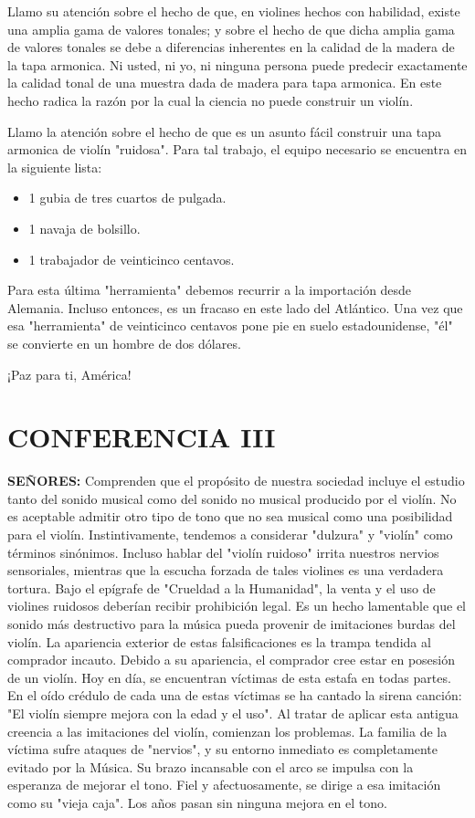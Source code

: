 \documentclass[12pt]{book}
\begin{document}
Llamo su atención sobre el hecho de que, en violines hechos con habilidad, existe una amplia gama de valores tonales; y sobre el hecho de que dicha amplia gama de valores tonales se debe a diferencias inherentes en la calidad de la madera de la tapa armonica. Ni usted, ni yo, ni ninguna persona puede predecir exactamente la calidad tonal de una muestra dada de madera para tapa armonica. En este hecho radica la razón por la cual la ciencia no puede construir un violín.

Llamo la atención sobre el hecho de que es un asunto fácil construir una tapa armonica de violín "ruidosa". Para tal trabajo, el equipo necesario se encuentra en la siguiente lista:

\begin{itemize}
    \item 1 gubia de tres cuartos de pulgada.
    \item 1 navaja de bolsillo.
    \item 1 trabajador de veinticinco centavos.
\end{itemize}

Para esta última "herramienta" debemos recurrir a la importación desde Alemania. Incluso entonces, es un fracaso en este lado del Atlántico. Una vez que esa "herramienta" de veinticinco centavos pone pie en suelo estadounidense, "él" se convierte en un hombre de dos dólares.

¡Paz para ti, América!

\chapter*{CONFERENCIA III}

\textbf{SEÑORES:} Comprenden que el propósito de nuestra sociedad incluye el estudio tanto del sonido musical como del sonido no musical producido por el violín. No es aceptable admitir otro tipo de tono que no sea musical como una posibilidad para el violín. Instintivamente, tendemos a considerar "dulzura" y "violín" como términos sinónimos. Incluso hablar del "violín ruidoso" irrita nuestros nervios sensoriales, mientras que la escucha forzada de tales violines es una verdadera tortura. Bajo el epígrafe de "Crueldad a la Humanidad", la venta y el uso de violines ruidosos deberían recibir prohibición legal. Es un hecho lamentable que el sonido más destructivo para la música pueda provenir de imitaciones burdas del violín. La apariencia exterior de estas falsificaciones es la trampa tendida al comprador incauto. Debido a su apariencia, el comprador cree estar en posesión de un violín. Hoy en día, se encuentran víctimas de esta estafa en todas partes. En el oído crédulo de cada una de estas víctimas se ha cantado la sirena canción: "El violín siempre mejora con la edad y el uso". Al tratar de aplicar esta antigua creencia a las imitaciones del violín, comienzan los problemas. La familia de la víctima sufre ataques de "nervios", y su entorno inmediato es completamente evitado por la Música. Su brazo incansable con el arco se impulsa con la esperanza de mejorar el tono. Fiel y afectuosamente, se dirige a esa imitación como su "vieja caja". Los años pasan sin ninguna mejora en el tono.
\end{document}
